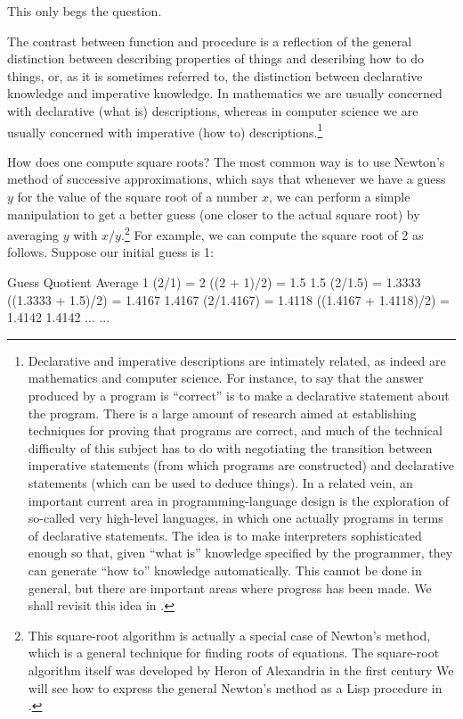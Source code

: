 \noindent
This only begs the question.

The contrast between function and procedure is a reflection of the general
distinction between describing properties of things and describing how to do
things, or, as it is sometimes referred to, the distinction between declarative
knowledge and imperative knowledge.  In mathematics we are usually concerned
with declarative (what is) descriptions, whereas in computer science we are
usually concerned with imperative (how to) descriptions.\footnote{Declarative
and imperative descriptions are intimately related, as indeed are mathematics
and computer science.  For instance, to say that the answer produced by a
program is ``correct'' is to make a declarative statement about the program.
There is a large amount of research aimed at establishing techniques for
proving that programs are correct, and much of the technical difficulty of this
subject has to do with negotiating the transition between imperative statements
(from which programs are constructed) and declarative statements (which can be
used to deduce things).  In a related vein, an important current area in
programming-language design is the exploration of so-called very high-level
languages, in which one actually programs in terms of declarative statements.
The idea is to make interpreters sophisticated enough so that, given ``what
is'' knowledge specified by the programmer, they can generate ``how to''
knowledge automatically.  This cannot be done in general, but there are
important areas where progress has been made.  We shall revisit this idea in
.}

How does one compute square roots?  The most common way is to use Newton's
method of successive approximations, which says that whenever we have a guess
\( y \) for the value of the square root of a number \( x \), we can perform a
simple manipulation to get a better guess (one closer to the actual square
root) by averaging \( y \) with \( x / y \).\footnote{This square-root algorithm
is actually a special case of Newton's method, which is a general technique for
finding roots of equations.  The square-root algorithm itself was developed by
Heron of Alexandria in the first century   We will see how to
express the general Newton's method as a Lisp procedure in .}
For example, we can compute the square root of 2 as follows.
Suppose our initial guess is 1:

\begin{compactExample}
Guess       Quotient                 Average
1           (2/1) = 2                ((2 + 1)/2) = 1.5
1.5         (2/1.5) = 1.3333         ((1.3333 + 1.5)/2) = 1.4167
1.4167      (2/1.4167) = 1.4118      ((1.4167 + 1.4118)/2) = 1.4142
1.4142      ...                      ...
\end{compactExample}

